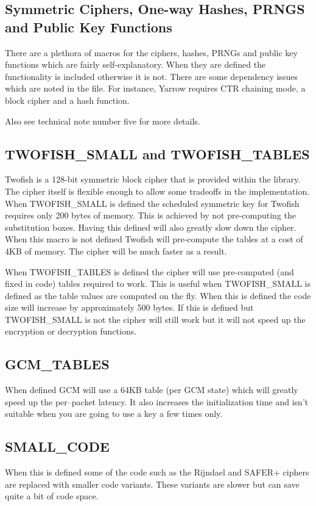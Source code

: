 \documentclass[a4paper]{book}
\begin{document}
\subsection{Symmetric Ciphers, One-way Hashes, PRNGS and Public Key Functions}
There are a plethora of macros for the ciphers, hashes, PRNGs and public key functions which are fairly 
self-explanatory.  When they are defined the functionality is included otherwise it is not.  There are some 
dependency issues which are noted in the file.  For instance, Yarrow requires CTR chaining mode, a block 
cipher and a hash function.

Also see technical note number five for more details.

\subsection{TWOFISH\_SMALL and TWOFISH\_TABLES}
Twofish is a 128-bit symmetric block cipher that is provided within the library.  The cipher itself is flexible enough
to allow some tradeoffs in the implementation.  When TWOFISH\_SMALL is defined the scheduled symmetric key for Twofish 
requires only 200 bytes of memory.  This is achieved by not pre-computing the substitution boxes.  Having this 
defined will also greatly slow down the cipher.  When this macro is not defined Twofish will pre-compute the 
tables at a cost of 4KB of memory.  The cipher will be much faster as a result.  

When TWOFISH\_TABLES is defined the cipher will use pre-computed (and fixed in code) tables required to work.  This is
useful when TWOFISH\_SMALL is defined as the table values are computed on the fly.  When this is defined the code size
will increase by approximately 500 bytes.  If this is defined but TWOFISH\_SMALL is not the cipher will still work but
it will not speed up the encryption or decryption functions.

\subsection{GCM\_TABLES}
When defined GCM will use a 64KB table (per GCM state) which will greatly speed up the per--packet latency.  
It also increases the initialization time and isn't suitable when you are going to use a key a few times only.  

\subsection{SMALL\_CODE}
When this is defined some of the code such as the Rijndael and SAFER+ ciphers are replaced with smaller code variants.
These variants are slower but can save quite a bit of code space.
\end{document}
